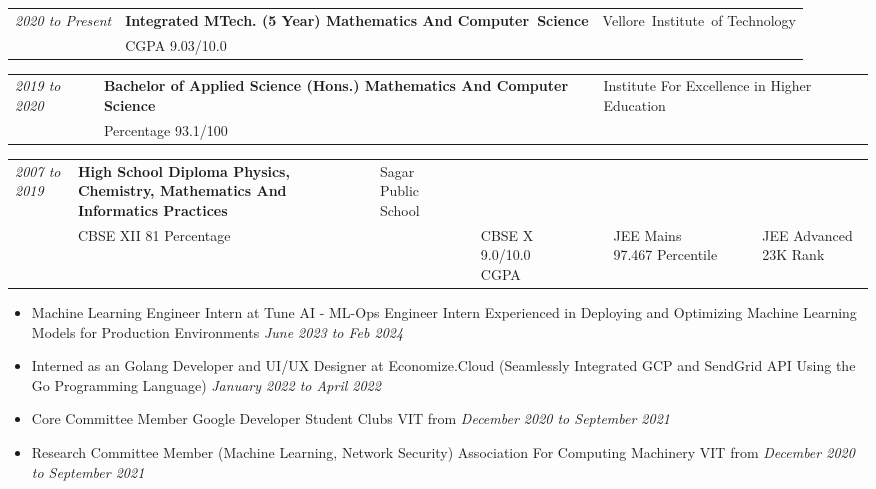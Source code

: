 \documentclass{myresume}
\begin{document}

        \begin{tabularx}{\textwidth}{ >{\hsize=0.25\hsize}X  >{\hsize=0.5\hsize}X >{\hsize=0.25\hsize}X }
                \textit{2020 to Present} & \textbf{Integrated MTech. (5 Year) Mathematics And \mbox{Computer Science} } & \mbox{Vellore Institute of} \mbox{Technology}\\
                & CGPA 9.03/10.0 & \\
        \end{tabularx}

        \begin{tabularx}{\textwidth}{ >{\hsize=0.25\hsize}X  >{\hsize=0.5\hsize}X >{\hsize=0.25\hsize}X }
            \textit{2019 to 2020} & \textbf{Bachelor of Applied Science (Hons.) {\hspace{1cm}} Mathematics And Computer Science} & Institute For Excellence in Higher Education\\
            & Percentage 93.1/100 & \\
        \end{tabularx} 
        
        \begin{tabularx}{\textwidth}{ >{\hsize}X  >{\hsize}X >{\hsize}X }
            \textit{2007 to 2019} & \textbf{High School Diploma Physics, Chemistry, Mathematics And Informatics Practices} & Sagar Public School\\
            & CBSE XII 81 Percentage & & & CBSE X 9.0/10.0 CGPA & & & JEE Mains 97.467 Percentile & & & JEE Advanced 23K Rank & \\ 
        \end{tabularx}
       
       
        \begin{itemize}
             	\item Machine Learning Engineer Intern at Tune AI - ML-Ops Engineer Intern Experienced in Deploying and Optimizing Machine Learning Models for Production Environments \textit {June 2023 to Feb 2024} 
        		\item Interned as an Golang Developer and UI/UX Designer at Economize.Cloud (Seamlessly Integrated GCP and SendGrid API Using the Go Programming Language) \textit {January 2022 to April 2022}
        		\item Core Committee Member  Google Developer Student Clubs VIT from \textit{December 2020 to September 2021}
                \item Research Committee Member (Machine Learning, Network Security)  Association For Computing Machinery  VIT from \textit{December 2020 to September 2021}
        \end{itemize}
\end{document}
